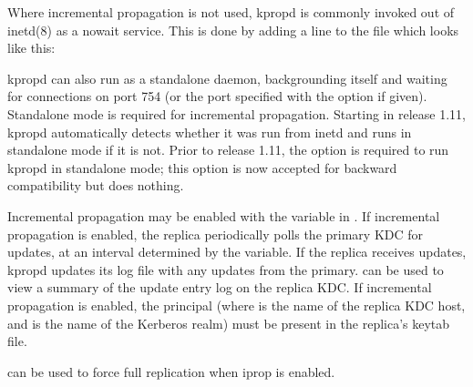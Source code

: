 \documentclass[letterpaper,10pt,english]{sphinxmanual}
\begin{document}
Where incremental propagation is not used, kpropd is commonly invoked
out of inetd(8) as a nowait service.  This is done by adding a line to
the  file which looks like this:

%
\begin{sphinxVerbatim}[commandchars=\\\{\}]
            
\end{sphinxVerbatim}

kpropd can also run as a standalone daemon, backgrounding itself and
waiting for connections on port 754 (or the port specified with the
 option if given).  Standalone mode is required for incremental
propagation.  Starting in release 1.11, kpropd automatically detects
whether it was run from inetd and runs in standalone mode if it is
not.  Prior to release 1.11, the  option is required to run
kpropd in standalone mode; this option is now accepted for backward
compatibility but does nothing.

Incremental propagation may be enabled with the 
variable in {\hyperref[\detokenize{admin/conf_files/kdc_conf:kdc-conf-5}]{}}.  If incremental propagation is
enabled, the replica periodically polls the primary KDC for updates, at
an interval determined by the  variable.  If the
replica receives updates, kpropd updates its log file with any updates
from the primary.  {\hyperref[\detokenize{admin/admin_commands/kproplog:kproplog-8}]{}} can be used to view a summary of
the update entry log on the replica KDC.  If incremental propagation
is enabled, the principal  (where
 is the name of the replica KDC host, and  is
the name of the Kerberos realm) must be present in the replica’s
keytab file.

{\hyperref[\detokenize{admin/admin_commands/kproplog:kproplog-8}]{}} can be used to force full replication when iprop is
enabled.
\end{document}
